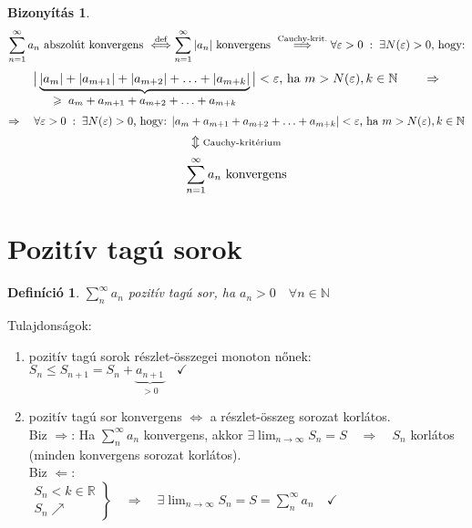 \documentclass[a4paper,12pt,twoside]{book}
\newtheorem{defi}{Definíció}[chapter]
\theoremstyle{break}
\newtheorem{biz}{Bizonyítás}[chapter]
\theoremstyle{plain}
\begin{document}
\begin{biz}
\[\sum^\infty_{n=1} a_n \hbox{ abszolút konvergens } \overset{\hbox{\scriptsize def}}{\Longleftrightarrow} \displaystyle \sum^\infty_{n=1} |a_n| \hbox{ konvergens } \overset{\hbox{\scriptsize Cauchy-krit.}}{\Longrightarrow} \forall \varepsilon>0 \;:\; \exists N(\varepsilon)>0 \hbox{, hogy:}\]
\[\big|\underbrace{|a_m|+|a_{m+1}|+|a_{m+2}|+\ldots+|a_{m+k}|}_{\text{\small $\geqslant \; a_m+a_{m+1}+a_{m+2}+\ldots+a_{m+k}$}}\big|<\varepsilon \hbox{, ha } m>N(\varepsilon), k\in\mathbb{N} \qquad \Rightarrow\]
\[\Rightarrow \quad \forall \varepsilon>0 \;:\; \exists N(\varepsilon)>0 \hbox{, hogy: } |a_m+a_{m+1}+a_{m+2}+\ldots+a_{m+k}|<\varepsilon \hbox{, ha } m>N(\varepsilon), k\in\mathbb{N}\]
\[\Updownarrow \hbox{\scriptsize Cauchy-kritérium}\]
\[\sum^\infty_{n=1} a_n \hbox{ konvergens}\]
\end{biz}

\section{Pozitív tagú sorok}

\begin{defi}$\displaystyle \sum^\infty_{n} a_n$ pozitív tagú sor, ha $a_n > 0 \quad \forall n\in\mathbb{N}$\end{defi}

Tulajdonságok:
\begin{enumerate}
 \item pozitív tagú sorok részlet-összegei monoton nőnek: $S_n \leqslant S_{n+1} = S_n + \underbrace{a_{n+1}}_{>0} \quad \checkmark$
 
 \item pozitív tagú sor konvergens $\Longleftrightarrow$ a részlet-összeg sorozat korlátos. \\
      Biz $\Rightarrow$: Ha $\displaystyle \sum^\infty_{n} a_n$ konvergens, akkor $\displaystyle \exists \lim_{n\to\infty} S_n = S \quad \Rightarrow \quad S_n$ korlátos (minden konvergens sorozat korlátos).\\

      Biz $\Leftarrow$:\\
      $\left.\begin{array}{l}
	S_n < k \in \mathbb{R} \\
	S_n \nearrow
       \end{array}\right\} \quad \Rightarrow \quad \exists \displaystyle \lim_{n\to\infty} S_n = S = \sum^\infty_{n} a_n \quad \checkmark$
\end{enumerate}
\end{document}
